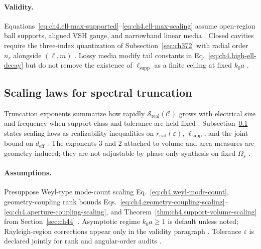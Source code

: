 \paragraph{Validity.}
Equations~\eqref{eq:ch4.ell-max-supported}--\eqref{eq:ch4.ell-max-scaling} assume open-region ball supports, aligned VSH gauge, and
narrowband linear media \cite{stratton1941,hansen1988}. Closed cavities require the three-index quantization of Subsection~\ref{sec:ch372}
with radial order \(n_{r}\) alongside \((\ell,m)\) \cite{harrington2001,collin2001}. Lossy media modify tail constants in
Eq.~\eqref{eq:ch4.high-ell-decay} but do not remove the existence of \(\ell_{\mathrm{supp}}\) as a finite ceiling at fixed \(k_{0}a\)
\cite{devaney2004,stratton1941}.


\subsection{Scaling laws for spectral truncation}
\label{sec:ch462}

Truncation exponents summarize how rapidly \(\mathcal{S}_{\mathrm{real}}(\mathcal{C})\) grows with electrical size and frequency when
support class and tolerance are held fixed \cite{stratton1941,jackson1999,hansen1988}. Subsection~\ref{sec:ch462} states scaling laws
as realizability inequalities on \(r_{\mathrm{rad}}(\varepsilon)\), \(\ell_{\mathrm{supp}}\), and the joint bound on
\(d_{\mathrm{eff}}\) \cite{harrington2001,devaney2004}. The exponents \(3\) and \(2\) attached to volume and area measures are
geometry-induced; they are not adjustable by phase-only synthesis on fixed \(\Omega_{s}\) \cite{collin2001,hansen1988}.

\paragraph{Assumptions.}
Presuppose Weyl-type mode-count scaling Eq.~\eqref{eq:ch4.weyl-mode-count}, geometry-coupling rank bounds
Eqs.~\eqref{eq:ch4.geometry-coupling-scaling}--\eqref{eq:ch4.aperture-coupling-scaling}, and
Theorem~\ref{thm:ch4.support-volume-scaling} from Section~\ref{sec:ch44} \cite{stratton1941,hansen1988,harrington2001}. Asymptotic
regime \(k_{0}a\ge1\) is default unless noted; Rayleigh-region corrections appear only in the validity paragraph
\cite{jackson1999,devaney2004}. Tolerance \(\varepsilon\) is declared jointly for rank and angular-order audits \cite{hansen1988}.

